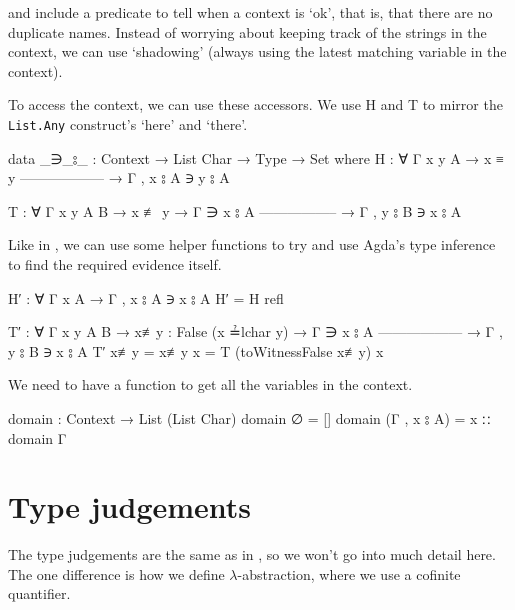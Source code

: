 \citet{aydemir_engineering_2008} and \citet{chargueraud_locally_2012} include a predicate to tell
when a context is `ok', that is, that there are no duplicate names. Instead of worrying about
keeping track of the strings in the context, we can use `shadowing' (always using the latest
matching variable in the context).

To access the context, we can use these accessors. We use H and T to mirror the \texttt{List.Any}
construct's `here' and `there'.
\begin{code}
  data _∋_⦂_ : Context → List Char → Type → Set where
    H : ∀ {Γ x y A}
      → x ≡ y
        ------------------
      → Γ , x ⦂ A ∋ y ⦂ A

    T : ∀ {Γ x y A B}
      → x ≢ y
      → Γ ∋ x ⦂ A
        -----------------
      → Γ , y ⦂ B ∋ x ⦂ A
\end{code}

Like in \citet{wadler_programming_2022}, we can use some helper functions to try and use Agda's type
inference to find the required evidence itself.
\begin{code}
  H′ : ∀ {Γ x A}
    → Γ , x ⦂ A ∋ x ⦂ A
  H′ = H refl

  T′ : ∀ {Γ x y A B}
    → {x≢y : False (x ≟lchar y)}
    → Γ ∋ x ⦂ A
      ------------------
    → Γ , y ⦂ B ∋ x ⦂ A
  T′ {x≢y = x≢y} x = T (toWitnessFalse x≢y) x
\end{code}

We need to have a function to get all the variables in the context.
\begin{code}
  domain : Context → List (List Char)
  domain ∅ = []
  domain (Γ , x ⦂ A) = x ∷ domain Γ
\end{code}

\section{Type judgements}
\label{appendix:type_judgements}
The type judgements are the same as in
\citet[chapter~Lambda]{wadler_programming_2022}, so we won't go into much detail here. The one
difference is how we define $\lambda$-abstraction, where we use a cofinite quantifier.


